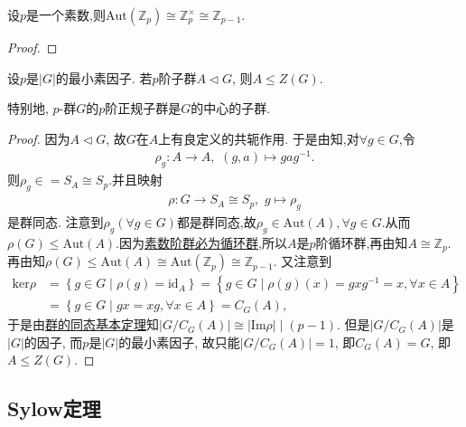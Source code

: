\documentclass[../../main.tex]{subfiles}%
\begin{document}
\begin{proposition}\label{proposition:Zp自同构群同构Z_p-1}
设$p$是一个素数,则$\text{Aut}(\mathbb{Z}_p)\cong\mathbb{Z}_{p}^{\times} \cong \mathbb{Z}_{p-1}$.
\end{proposition}
\begin{proof}

\end{proof}

\begin{example}
设$p$是$|G|$的最小素因子. 若$p$阶子群$A \lhd G$, 则$A \leqslant Z(G)$.

特别地, $p$-群$G$的$p$阶正规子群是$G$的中心的子群.
\end{example}
\begin{proof}
因为$A \lhd G$, 故$G$在$A$上有良定义的共轭作用. 于是由知,对$\forall g\in G$,令
\begin{align*}
\rho_g: A\to A,\,\,(g,a)\mapsto gag^{-1}.
\end{align*}
则$\rho_g\in =S_A\cong S_p$.并且映射
\begin{align*}
\rho: G \to S_A \cong S_p,\,\,g\mapsto \rho_g
\end{align*}
是群同态.
注意到$\rho_g(\forall g\in G)$都是群同态,故$\rho_g\in \text{Aut}(A),\forall g\in G$.从而$\rho(G)\leqslant \mathrm{Aut}(A) $.因为\hyperref[proposition:素数阶群必为循环群]{素数阶群必为循环群},所以$A$是$p$阶循环群,再由知$A\cong \mathbb{Z}_p$.
再由知$\rho(G)\leqslant\mathrm{Aut}(A)\cong \mathrm{Aut}(\mathbb{Z}_p)\cong \mathbb{Z}_{p-1}$.
又注意到
\begin{align*}
\mathrm{ker}\rho &=\left\{ g\in G\mid \rho \left( g \right) =\mathrm{id}_A \right\} =\left\{ g\in G\mid \rho \left( g \right) \left( x \right) =gxg^{-1}=x,\forall x\in A \right\} 
\\
&=\left\{ g\in G\mid gx=xg,\forall x\in A \right\} =C_G(A),
\end{align*}
于是由\hyperref[theorem:群的同态基本定理]{群的同态基本定理}知$|G/C_G(A)| \cong |\mathrm{Im}\rho| \mid (p-1)$. 但是$|G/C_G(A)|$是$|G|$的因子, 而$p$是$|G|$的最小素因子, 故只能$|G/C_G(A)| = 1$, 即$C_G(A) = G$, 即$A \leqslant Z(G)$.
\end{proof}


\subsection{Sylow定理}
\end{document}
